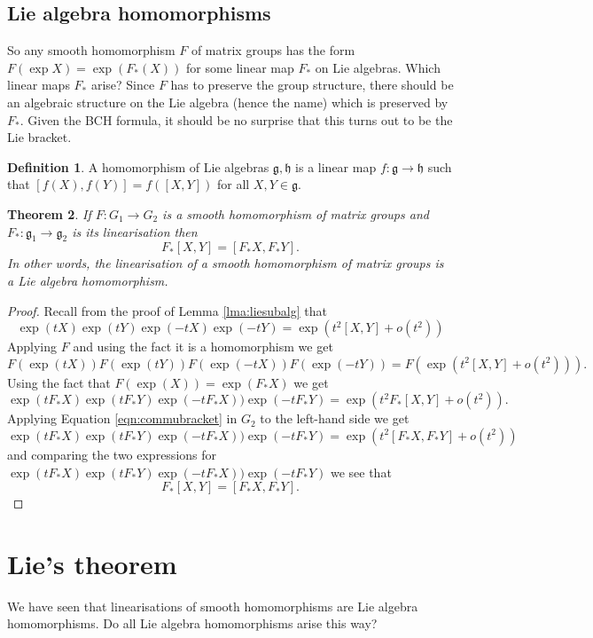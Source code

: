 \documentclass[12pt]{article}
\newtheorem{thm}{Theorem}[section]
\theoremstyle{definition}
\newtheorem{dfn}[thm]{Definition}
\theoremstyle{check}
\theoremstyle{remark}
\theoremstyle{TheoremNum}
\begin{document}
\subsection{Lie algebra homomorphisms}

So any smooth homomorphism $F$ of matrix groups has the form $F(\exp X)=\exp(F_*(X))$ for some linear map $F_*$ on Lie algebras. Which linear maps $F_*$ arise? Since $F$ has to preserve the group structure, there should be an algebraic structure on the Lie algebra (hence the name) which is preserved by $F_*$. Given the BCH formula, it should be no surprise that this turns out to be the Lie bracket.

\begin{dfn}
A homomorphism of Lie algebras $\mathfrak{g},\mathfrak{h}$ is a linear map $f\colon\mathfrak{g}\to\mathfrak{h}$ such that $[f(X),f(Y)]=f([X,Y])$ for all $X,Y\in\mathfrak{g}$.
\end{dfn}

\begin{thm}\label{thm:linliehom}
If $F\colon G_1\to G_2$ is a smooth homomorphism of matrix groups and $F_*\colon\mathfrak{g}_1\to\mathfrak{g}_2$ is its linearisation then
\[F_*[X,Y]=[F_*X,F_*Y].\]
In other words, the linearisation of a smooth homomorphism of matrix groups is a Lie algebra homomorphism.
\end{thm}
\begin{proof}
Recall from the proof of Lemma \ref{lma:liesubalg} that
\begin{equation}\label{eqn:commubracket}\exp(tX)\exp(tY)\exp(-tX)\exp(-tY)=\exp(t^2[X,Y]+o(t^2))\end{equation}
Applying $F$ and using the fact it is a homomorphism we get
\[F(\exp(tX))F(\exp(tY))F(\exp(-tX))F(\exp(-tY))=F(\exp(t^2[X,Y]+o(t^2))).\]
Using the fact that $F(\exp(X))=\exp(F_*X)$ we get
\[\exp(tF_*X)\exp(tF_*Y)\exp(-tF_*X))\exp(-tF_*Y)=\exp(t^2F_*[X,Y]+o(t^2)).\]
Applying Equation \eqref{eqn:commubracket} in $G_2$ to the left-hand side we get
\[\exp(tF_*X)\exp(tF_*Y)\exp(-tF_*X))\exp(-tF_*Y)=\exp(t^2[F_*X,F_*Y]+o(t^2))\]
and comparing the two expressions for $\exp(tF_*X)\exp(tF_*Y)\exp(-tF_*X))\exp(-tF_*Y)$ we see that
\[F_*[X,Y]=[F_*X,F_*Y].\]
\end{proof}

\section{Lie's theorem}

We have seen that linearisations of smooth homomorphisms are Lie algebra homomorphisms. Do all Lie algebra homomorphisms arise this way?
\end{document}
